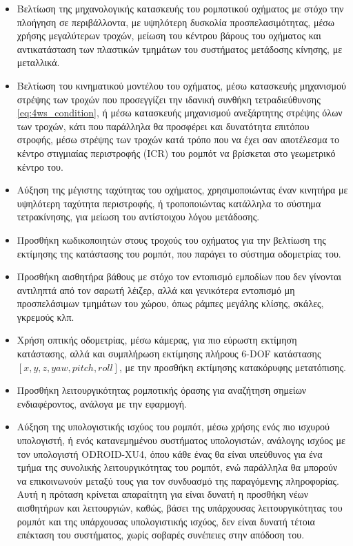 \begin{itemize}
	\item Βελτίωση της μηχανολογικής κατασκευής του ρομποτικού οχήματος με στόχο την πλοήγηση σε περιβάλλοντα, με υψηλότερη δυσκολία προσπελασιμότητας, μέσω χρήσης μεγαλύτερων τροχών, μείωση του κέντρου βάρους του οχήματος και αντικατάσταση των πλαστικών τμημάτων του συστήματος μετάδοσης κίνησης, με μεταλλικά.
	\item Βελτίωση του κινηματικού μοντέλου του οχήματος, μέσω κατασκευής μηχανισμού στρέψης των τροχών που προσεγγίζει την ιδανική συνθήκη τετραδιεύθυνσης \ref{eq:4ws_condition}, ή μέσω κατασκευής μηχανισμού ανεξάρτητης στρέψης όλων των τροχών, κάτι που παράλληλα θα προσφέρει και δυνατότητα επιτόπου στροφής, μέσω στρέψης των τροχών κατά τρόπο που να έχει σαν αποτέλεσμα το κέντρο στιγμιαίας περιστροφής (ICR) του ρομπότ να βρίσκεται στο γεωμετρικό κέντρο του.
	\item Αύξηση της μέγιστης ταχύτητας του οχήματος, χρησιμοποιώντας έναν κινητήρα με υψηλότερη ταχύτητα περιστροφής, ή τροποποιώντας κατάλληλα το σύστημα τετρακίνησης, για μείωση του αντίστοιχου λόγου μετάδοσης.
	\item Προσθήκη κωδικοποιητών στους τροχούς του οχήματος για την βελτίωση της εκτίμησης της κατάστασης του ρομπότ, που παράγει το σύστημα οδομετρίας του.
	\item Προσθήκη αισθητήρα βάθους με στόχο τον εντοπισμό εμποδίων που δεν γίνονται αντιληπτά από τον σαρωτή λέιζερ, αλλά και γενικότερα εντοπισμό μη προσπελάσιμων τμημάτων του χώρου, όπως ράμπες μεγάλης κλίσης, σκάλες, γκρεμούς κλπ.
	\item Χρήση οπτικής οδομετρίας, μέσω κάμερας, για πιο εύρωστη εκτίμηση κατάστασης, αλλά και συμπλήρωση εκτίμησης πλήρους 6-DOF κατάστασης $[x,y,z,yaw,pitch,roll]$, με την προσθήκη εκτίμησης κατακόρυφης μετατόπισης.
	\item Προσθήκη λειτουργικότητας ρομποτικής όρασης για αναζήτηση σημείων ενδιαφέροντος, ανάλογα με την εφαρμογή.
	\item Αύξηση της υπολογιστικής ισχύος του ρομπότ, μέσω χρήσης ενός πιο ισχυρού υπολογιστή, ή ενός κατανεμημένου συστήματος υπολογιστών, ανάλογης ισχύος με τον υπολογιστή ODROID-XU4, όπου κάθε ένας θα είναι υπεύθυνος για ένα τμήμα της συνολικής λειτουργικότητας του ρομπότ, ενώ παράλληλα θα μπορούν να επικοινωνούν μεταξύ τους για τον συνδυασμό της παραγόμενης πληροφορίας. Αυτή η πρόταση κρίνεται απαραίτητη για είναι δυνατή η προσθήκη νέων αισθητήρων και λειτουργιών, καθώς, βάσει της υπάρχουσας λειτουργικότητας του ρομπότ και της υπάρχουσας υπολογιστικής ισχύος, δεν είναι δυνατή τέτοια επέκταση του συστήματος, χωρίς σοβαρές συνέπειες στην απόδοση του.

\end{itemize}
